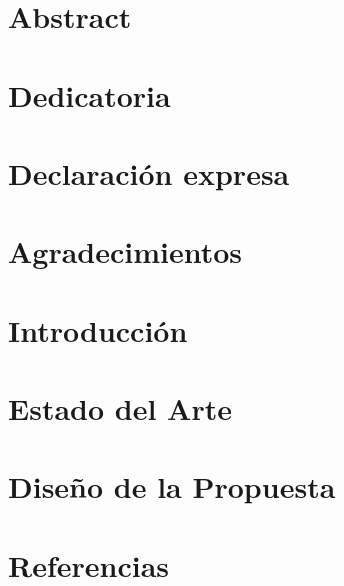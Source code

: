 \documentclass[12pt,twoside]{report}
\begin{document}
    
        
    
        
        \chapter*{Abstract}
        
        
        \chapter*{Dedicatoria}
        
        
        \chapter*{Declaración expresa}
        
        
        \chapter*{Agradecimientos}
        
        
        \tableofcontents
        
        \listoffigures
         
        \listoftables
        
        \chapter{Introducción}
        
        \chapter{Estado del Arte}
        
        \chapter{Diseño de la Propuesta}
        
        
        \chapter{Referencias}
         
        
        
    
    
\end{document}
